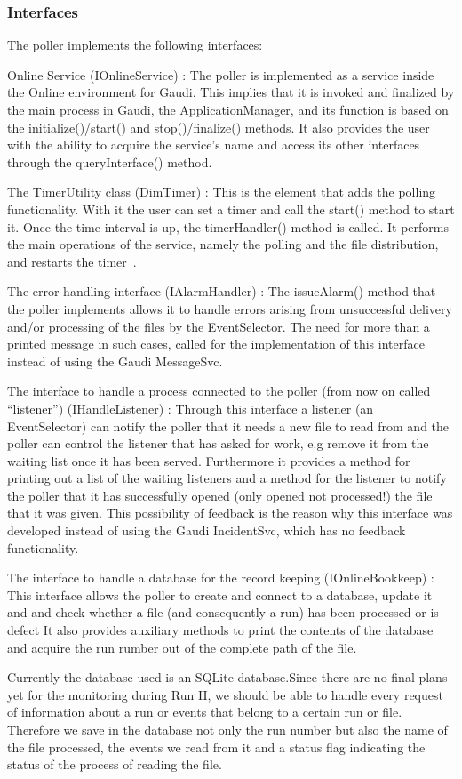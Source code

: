 \subsubsection{\textbf{Interfaces}}
The poller implements the following interfaces:\par
\bigskip\noindent
Online Service (IOnlineService) : The poller is implemented as a service inside the Online environment for Gaudi. This implies that it is invoked and finalized by the main process in Gaudi, the ApplicationManager, and its function is based on the initialize()/start() and stop()/finalize() methods. It also provides the user with the ability to acquire the service's name and access its other interfaces through the queryInterface() method.\par
\bigskip\noindent
The TimerUtility class (DimTimer) : This is the element that adds the polling functionality. With it the user can set a timer and call the start() method to start it. Once the time interval is up, the timerHandler() method is called. It performs the main operations of the service, namely the polling and the file distribution, and restarts the timer~\cite{Gaspar2001102}. \par
\bigskip\noindent
The error handling interface (IAlarmHandler) : The issueAlarm() method that the poller implements allows it to handle errors arising from unsuccessful delivery and/or processing of the files by the EventSelector. The need for more than a printed message in such cases, called for the implementation of this interface instead of using the Gaudi MessageSvc.\par 
\bigskip\noindent
The interface to handle a process connected to the poller (from now on called “listener”) (IHandleListener) : Through this interface a listener (an EventSelector) can notify the poller that it needs a new file to read from and the poller can control the listener that has asked for work, e.g remove it from the waiting list once it has been served. Furthermore it provides a method for printing out a list of the waiting listeners and a method for the listener to notify the poller that it has successfully opened (only opened not processed!) the file that it was given. This possibility of feedback is the reason why this interface was developed instead of using the Gaudi IncidentSvc, which has no feedback functionality.\par
\bigskip\noindent
The interface to handle a database for the record keeping (IOnlineBookkeep) : This interface allows the poller to create and connect to a database, update it and and check whether a file (and consequently a run) has been processed or is defect It also provides auxiliary methods to print the contents of the database and acquire the run rumber out of the complete path of the file.\par
Currently the database used is an SQLite database.Since there are no final plans yet for the monitoring during Run II, we should be able to handle every request of information about a run or events that belong to a certain run or file. Therefore we save in the database not only the run number but also the name of the file processed, the events we read from it and a status flag indicating the status of the process of reading the file.
\par

